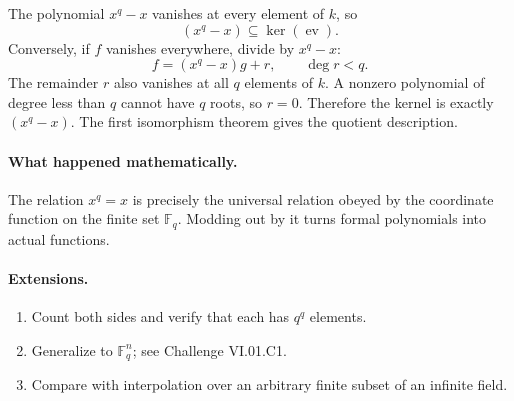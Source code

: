 The polynomial \(x^q-x\) vanishes at every element of \(k\), so
\[
(x^q-x)\subseteq\ker(\operatorname{ev}).
\]
Conversely, if \(f\) vanishes everywhere, divide by \(x^q-x\):
\[
f=(x^q-x)g+r,
\qquad \deg r<q.
\]
The remainder \(r\) also vanishes at all \(q\) elements of \(k\).  A nonzero polynomial of
degree less than \(q\) cannot have \(q\) roots, so \(r=0\).  Therefore the kernel is
exactly \((x^q-x)\).  The first isomorphism theorem gives the quotient description.

\paragraph{What happened mathematically.}
The relation \(x^q=x\) is precisely the universal relation obeyed by the coordinate
function on the finite set \(\mathbb F_q\).  Modding out by it turns formal polynomials into
actual functions.

\paragraph{Extensions.}
\begin{enumerate}
\item Count both sides and verify that each has \(q^q\) elements.
\item Generalize to \(\mathbb F_q^n\); see Challenge VI.01.C1.
\item Compare with interpolation over an arbitrary finite subset of an infinite field.
\end{enumerate}
\fi
